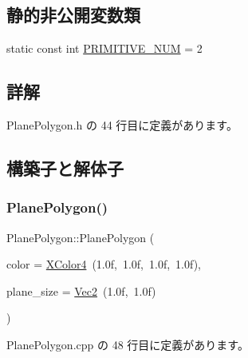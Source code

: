 \subsection*{静的非公開変数類}
\begin{DoxyCompactItemize}
\item 
static const int \mbox{\hyperlink{class_plane_polygon_ad79c2128868044fb495b70ee08c65e8c}{P\+R\+I\+M\+I\+T\+I\+V\+E\+\_\+\+N\+UM}} = 2
\end{DoxyCompactItemize}


\subsection{詳解}


 Plane\+Polygon.\+h の 44 行目に定義があります。



\subsection{構築子と解体子}
\mbox{\label{class_plane_polygon_a27987c23a242840b142e0fa11650daf6}} 
\subsubsection{\texorpdfstring{Plane\+Polygon()}{PlanePolygon()}}
{\footnotesize\ttfamily Plane\+Polygon\+::\+Plane\+Polygon (\begin{DoxyParamCaption}\item[{\mbox{\hyperlink{_vector3_d_8h_a680c30c4a07d86fe763c7e01169cd6cc}{X\+Color4}}}]{color = {\ttfamily \mbox{\hyperlink{_vector3_d_8h_a680c30c4a07d86fe763c7e01169cd6cc}{X\+Color4}}~(1.0f,~1.0f,~1.0f,~1.0f)},  }\item[{\mbox{\hyperlink{_vector3_d_8h_a5ef6e95dfc5f9d3820b71772d99bbc25}{Vec2}}}]{plane\+\_\+size = {\ttfamily \mbox{\hyperlink{_vector3_d_8h_a5ef6e95dfc5f9d3820b71772d99bbc25}{Vec2}}~(1.0f,~1.0f)} }\end{DoxyParamCaption})}



 Plane\+Polygon.\+cpp の 48 行目に定義があります。

